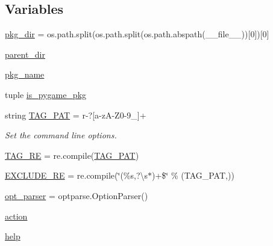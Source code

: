 \subsection*{Variables}
\begin{DoxyCompactItemize}
\item 
\hyperlink{namespacepygame_1_1tests_1_1test__utils_1_1test__runner_a5b509e61959e6f1e41eeaae3237eb38a}{pkg\+\_\+dir} = os.\+path.\+split(os.\+path.\+split(os.\+path.\+abspath(\+\_\+\+\_\+file\+\_\+\+\_\+))\mbox{[}0\mbox{]})\mbox{[}0\mbox{]}
\item 
\hyperlink{namespacepygame_1_1tests_1_1test__utils_1_1test__runner_a4d3b7bfa03e6d642e73066cf08ae06e4}{parent\+\_\+dir}
\item 
\hyperlink{namespacepygame_1_1tests_1_1test__utils_1_1test__runner_abf407e1f208c78677da60579f93abdbc}{pkg\+\_\+name}
\item 
tuple \hyperlink{namespacepygame_1_1tests_1_1test__utils_1_1test__runner_a35486a5db8f927155a3f2f949770e3d2}{is\+\_\+pygame\+\_\+pkg}
\item 
string \hyperlink{namespacepygame_1_1tests_1_1test__utils_1_1test__runner_a9413763242a446828295d1faff4f1602}{T\+A\+G\+\_\+\+P\+AT} = r\textquotesingle{}-\/?\mbox{[}a-\/zA-\/Z0-\/9\+\_\+\mbox{]}+\textquotesingle{}
\begin{DoxyCompactList}\small\item\em Set the command line options. \end{DoxyCompactList}\item 
\hyperlink{namespacepygame_1_1tests_1_1test__utils_1_1test__runner_a44e3dd025592f6dee2b1d7becec61b17}{T\+A\+G\+\_\+\+RE} = re.\+compile(\hyperlink{namespacepygame_1_1tests_1_1test__utils_1_1test__runner_a9413763242a446828295d1faff4f1602}{T\+A\+G\+\_\+\+P\+AT})
\item 
\hyperlink{namespacepygame_1_1tests_1_1test__utils_1_1test__runner_ae4cb50fa276c5b0754a1187b9423b1dd}{E\+X\+C\+L\+U\+D\+E\+\_\+\+RE} = re.\+compile(\char`\"{}(\%s,?\textbackslash{}s$\ast$)+\$\char`\"{} \% (T\+A\+G\+\_\+\+P\+AT,))
\item 
\hyperlink{namespacepygame_1_1tests_1_1test__utils_1_1test__runner_a0d72027203a14cf52d4f1687b8258f8e}{opt\+\_\+parser} = optparse.\+Option\+Parser()
\item 
\hyperlink{namespacepygame_1_1tests_1_1test__utils_1_1test__runner_a525d5f7609073d69eb8b118e095fb5fd}{action}
\item 
\hyperlink{namespacepygame_1_1tests_1_1test__utils_1_1test__runner_af12ce7b66e46019930502d3921ec7df4}{help}

\end{DoxyCompactItemize}
